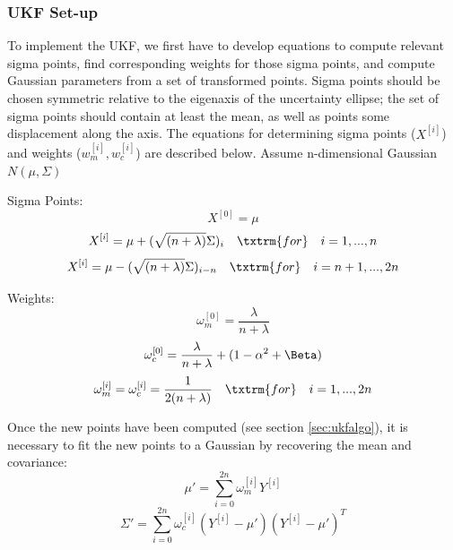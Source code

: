 \documentclass[twoside]{article}
\begin{document}
\subsubsection{UKF Set-up}
To implement the UKF, we first have to develop equations to compute relevant sigma points, find corresponding weights for those sigma points, and compute Gaussian parameters from a set of transformed points. Sigma points should be chosen symmetric relative to the eigenaxis of the uncertainty ellipse; the set of sigma points should contain at least the mean, as well as points some displacement along the axis. The equations for determining sigma points ($X^{[i]}$) and weights ($w_m^{[i]}, w_c^{[i]}$) are described below. Assume n-dimensional Gaussian $N(\mu,\Sigma)$

\par Sigma Points:
\begin{equation}
    X^{[0]} = \mu
\end{equation}
\begin{equation}
    X^{[i]} = \mu + (\sqrt{(n+\lambda)}\Sigma)_{i} \quad \txtrm{for} \quad i=1,...,n
\end{equation}
\begin{equation}
    X^{[i]} = \mu - (\sqrt{(n+\lambda)}\Sigma)_{i-n} \quad \txtrm{for} \quad i=n+1,...,2n
\end{equation}

Weights:
\begin{equation}
    \omega_{m}^{[0]}=\frac{\lambda}{n+\lambda}
\end{equation}
\begin{equation}
    \omega_{c}^{[0]}=\frac{\lambda}{n+\lambda}+(1-\alpha^{2}+\Beta) 
\end{equation}
\begin{equation}
    \omega_{m}^{[i]}=\omega_{c}^{[i]}=\frac{1}{2(n+\lambda)} \quad \txtrm{for} \quad i=1,...,2n
\end{equation}

Once the new points have been computed (see section \ref{sec:ukfalgo}), it is necessary to fit the new points to a Gaussian by recovering the mean and covariance:
\begin{equation}
    \mu' = \sum_{i=0}^{2n}\omega_{m}^{[i]}Y^{[i]}
\end{equation}
\begin{equation}
    \Sigma' = \sum_{i=0}^{2n}\omega_{c}^{[i]}(Y^{[i]}-\mu')(Y^{[i]}-\mu')^{T}
\end{equation}
\end{document}
